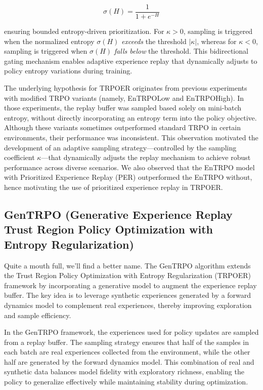 \documentclass{article}
\begin{document}
\begin{equation}
\sigma(H) = \frac{1}{1 + e^{-H}}
\end{equation}

\noindent ensuring bounded entropy-driven prioritization. For \( \kappa > 0 \), sampling is triggered when the normalized entropy \( \sigma(H) \) {\it exceeds} the threshold \( \lvert \kappa \rvert \), whereas for \( \kappa < 0 \), sampling is triggered when \( \sigma(H) \) {\it falls below} the threshold. This bidirectional gating mechanism enables adaptive experience replay that dynamically adjusts to policy entropy variations during training.

The underlying hypothesis for TRPOER originates from previous experiments with modified TRPO variants (namely, EnTRPOLow and EnTRPOHigh). In those experiments, the replay buffer was sampled based solely on mini-batch entropy, without directly incorporating an entropy term into the policy objective. Although these variants sometimes outperformed standard TRPO in certain environments, their performance was inconsistent. This observation motivated the development of an adaptive sampling strategy—controlled by the sampling coefficient \( \kappa \)—that dynamically adjusts the replay mechanism to achieve robust performance across diverse scenarios. We also observed that the EnTRPO model with Prioritized Experience Replay (PER) outperformed the EnTRPO without, hence motivating the use of prioritized experience replay in TRPOER.




\subsection{GenTRPO (Generative Experience Replay Trust Region Policy Optimization with Entropy Regularization)}

Quite a mouth full, we'll find a better name. The GenTRPO algorithm extends the Trust Region Policy Optimization with Entropy Regularization (TRPOER) framework \cite{schulman2017proximalpolicyoptimizationalgorithms,schulman2017trustregionpolicyoptimization} by incorporating a generative model to augment the experience replay buffer. The key idea is to leverage synthetic experiences generated by a forward dynamics model to complement real experiences, thereby improving exploration and sample efficiency. 

In the GenTRPO framework, the experiences used for policy updates are sampled from a replay buffer. The sampling strategy ensures that half of the samples in each batch are real experiences collected from the environment, while the other half are generated by the forward dynamics model. This combination of real and synthetic data balances model fidelity with exploratory richness, enabling the policy to generalize effectively while maintaining stability during optimization.
\end{document}
